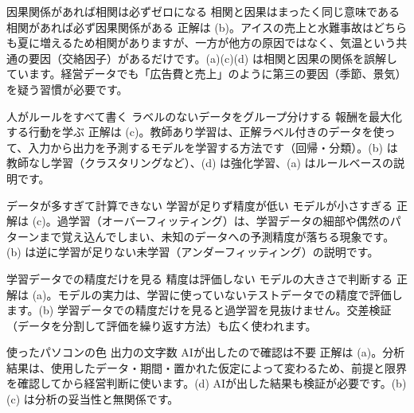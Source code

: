 
%
  {因果関係があれば相関は必ずゼロになる}%
  {}%
  {相関と因果はまったく同じ意味である}%
  {相関があれば必ず因果関係がある}%
  {正解は (b)。アイスの売上と水難事故はどちらも夏に増えるため相関がありますが、一方が他方の原因ではなく、気温という共通の要因（交絡因子）があるだけです。(a)(c)(d) は相関と因果の関係を誤解しています。経営データでも「広告費と売上」のように第三の要因（季節、景気）を疑う習慣が必要です。}

%
  {人がルールをすべて書く}%
  {ラベルのないデータをグループ分けする}%
  {}%
  {報酬を最大化する行動を学ぶ}%
  {正解は (c)。教師あり学習は、正解ラベル付きのデータを使って、入力から出力を予測するモデルを学習する方法です（回帰・分類）。(b) は教師なし学習（クラスタリングなど）、(d) は強化学習、(a) はルールベースの説明です。}

%
  {データが多すぎて計算できない}%
  {学習が足りず精度が低い}%
  {}%
  {モデルが小さすぎる}%
  {正解は (c)。過学習（オーバーフィッティング）は、学習データの細部や偶然のパターンまで覚え込んでしまい、未知のデータへの予測精度が落ちる現象です。(b) は逆に学習が足りない未学習（アンダーフィッティング）の説明です。}

%
  {}%
  {学習データでの精度だけを見る}%
  {精度は評価しない}%
  {モデルの大きさで判断する}%
  {正解は (a)。モデルの実力は、学習に使っていないテストデータでの精度で評価します。(b) 学習データでの精度だけを見ると過学習を見抜けません。交差検証（データを分割して評価を繰り返す方法）も広く使われます。}

%
  {}%
  {使ったパソコンの色}%
  {出力の文字数}%
  {AIが出したので確認は不要}%
  {正解は (a)。分析結果は、使用したデータ・期間・置かれた仮定によって変わるため、前提と限界を確認してから経営判断に使います。(d) AIが出した結果も検証が必要です。(b)(c) は分析の妥当性と無関係です。}
